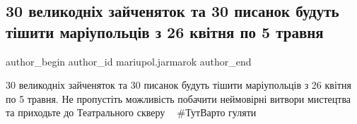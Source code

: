  
 
 
 
 

\subsection{30 великодніх зайченяток та 30 писанок будуть тішити маріупольців з 26 квітня по 5 травня}
\label{sec:26_04_2019.fb.mariupol.jarmarok.1.30_pysanok_30_zajchenjat}

\ifcmt
 author_begin
   author_id mariupol.jarmarok
 author_end
\fi

30 великодніх зайченяток та 30 писанок будуть тішити маріупольців з 26 квітня
по 5 травня. Не пропустіть можливість побачити неймовірні витвори мистецтва та
приходьте до Театрального скверу 🐰🐰 \#ТутВарто гуляти
